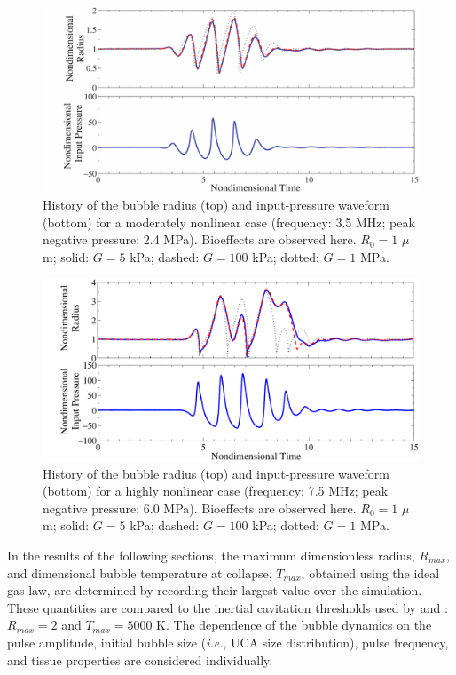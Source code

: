 \begin{figure}[!t]
  \centering \includegraphics[width=\textwidth]{figs/bubble_figs/Rt_intermediate}%
  \caption{History of the bubble radius (top) and input-pressure
    waveform (bottom) for a moderately nonlinear case (frequency: 3.5
    MHz; peak negative pressure: 2.4 MPa). Bioeffects are observed
    here. $R_0=1$ $\mu$m; solid: $G=5$ kPa; dashed: $G=100$ kPa;
    dotted: $G=1$ MPa.}
  \label{fig:sample_bubble_intermediate}
\end{figure}

\begin{figure}[!t]
  \centering \includegraphics[width=\textwidth]{figs/bubble_figs/Rt_nonlinear}
  \caption{History of the bubble radius (top) and input-pressure
    waveform (bottom) for a highly nonlinear case (frequency: 7.5 MHz;
    peak negative pressure: 6.0 MPa). Bioeffects are observed
    here. $R_0=1$ $\mu$m; solid: $G=5$ kPa; dashed: $G=100$ kPa;
    dotted: $G=1$ MPa.}
  \label{fig:sample_bubble_nonlinear}
\end{figure}

In the results of the following sections, the maximum dimensionless
radius, $R_{max}$, and dimensional bubble temperature at collapse,
$T_{max}$, obtained using the ideal gas law, are determined by
recording their largest value over the simulation. These quantities
are compared to the inertial cavitation thresholds used by
\cite{apfel1991} and \cite{Yang2005}: $R_{max}=2$ and $T_{max}=5000$
K. The dependence of the bubble dynamics on the pulse amplitude,
initial bubble size (\emph{i.e.}, UCA size distribution), pulse
frequency, and tissue properties are considered individually.



